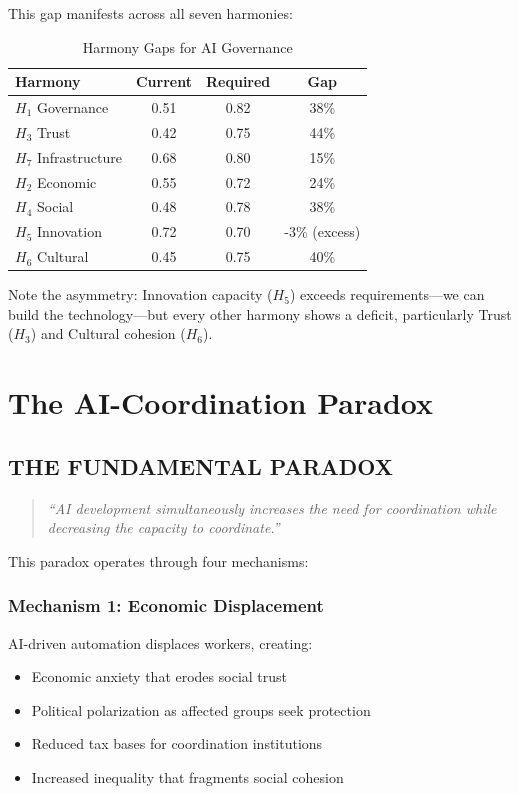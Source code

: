 \documentclass[11pt,letterpaper]{article}
\begin{document}
This gap manifests across all seven harmonies:

\begin{table}[H]
\centering
\caption{Harmony Gaps for AI Governance}
\begin{tabular}{lccc}
\toprule
\textbf{Harmony} & \textbf{Current} & \textbf{Required} & \textbf{Gap} \\
\midrule
$H_1$ Governance & 0.51 & 0.82 & 38\% \\
$H_3$ Trust & 0.42 & 0.75 & 44\% \\
$H_7$ Infrastructure & 0.68 & 0.80 & 15\% \\
$H_2$ Economic & 0.55 & 0.72 & 24\% \\
$H_4$ Social & 0.48 & 0.78 & 38\% \\
$H_5$ Innovation & 0.72 & 0.70 & -3\% (excess) \\
$H_6$ Cultural & 0.45 & 0.75 & 40\% \\
\bottomrule
\end{tabular}
\label{tab:harmony_gaps}
\end{table}

Note the asymmetry: Innovation capacity ($H_5$) exceeds requirements---we can build the technology---but every other harmony shows a deficit, particularly Trust ($H_3$) and Cultural cohesion ($H_6$).

\section{The AI-Coordination Paradox}

\subsection{THE FUNDAMENTAL PARADOX}

\begin{quote}
\textit{``AI development simultaneously increases the need for coordination while decreasing the capacity to coordinate.''}
\end{quote}

This paradox operates through four mechanisms:

\subsubsection{Mechanism 1: Economic Displacement}

AI-driven automation displaces workers, creating:
\begin{itemize}
\item Economic anxiety that erodes social trust
\item Political polarization as affected groups seek protection
\item Reduced tax bases for coordination institutions
\item Increased inequality that fragments social cohesion
\end{itemize}
\end{document}
